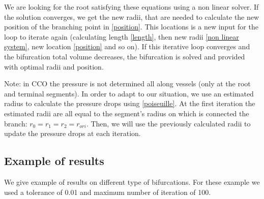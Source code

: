 \documentclass[a4paper, 11pt]{article} %
\begin{document}
We are looking for the root satisfying these equations using a non linear solver. If the solution converges, we get the new radii, that are needed to calculate the new position of the branching point in \eqref{position}. This locations is a new input for the loop to iterate again (calculating length \eqref{length}, then new radii \eqref{non linear system}, new location \eqref{position} and so on). 
If this iterative loop converges and the bifurcation total volume decreases, the bifurcation is solved and provided with optimal radii and position.

Note: in CCO the pressure is not determined all along vessels (only at the root and terminal segments). In order to adapt to our situation, we use an estimated radius to calculate the pressure drops using \eqref{poiseuille}. At the first iteration the estimated radii are all equal to the segment's radius on which is connected the branch: $r_0 = r_1 = r_2 = r_{ori}$.
Then, we will use the previously calculated radii to update the pressure drops at each iteration.

\subsection*{Example of results}
We give example of results on different type of bifurcations. For these example we used a tolerance of 0.01 and maximum number of iteration of 100.\\
\end{document}

